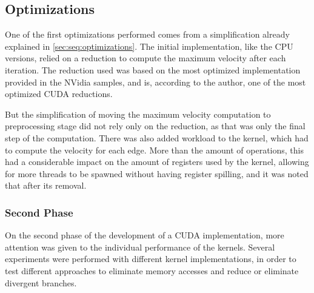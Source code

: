 \subsection{Optimizations}
\label{subsec:cuda:load}


One of the first optimizations performed comes from a simplification already explained in \cref{sec:seq:optimizations}.
The initial implementation, like the CPU versions, relied on a reduction to compute the maximum velocity after each iteration.
The reduction used was based on the most optimized implementation provided in the NVidia samples, and is, according to the author, one of the most optimized CUDA reductions.

But the simplification of moving the maximum velocity computation to preprocessing stage did not rely only on the reduction, as that was only the final step of the computation.
There was also added workload to the \computeflux kernel, which had to compute the velocity for each edge. More than the amount of operations, this had a considerable impact on the amount of registers used by the kernel, allowing for more threads to be spawned without having register spilling, and it was noted that after its removal.


\subsubsection{Second Phase}
\label{subsubsec:cuda:load:second}

On the second phase of the development of a CUDA implementation, more attention was given to the individual performance of the kernels.
Several experiments were performed with different kernel implementations, in order to test different approaches to eliminate memory accesses and reduce or eliminate divergent branches.

